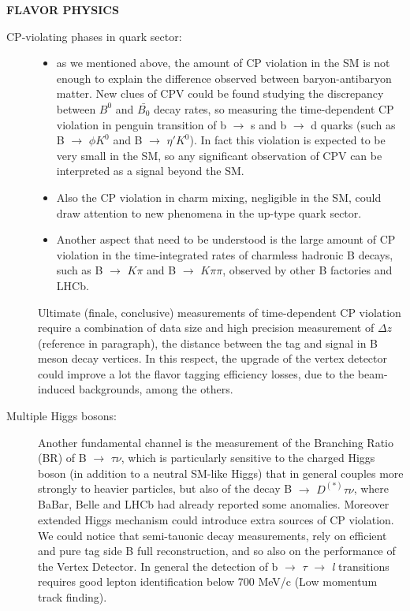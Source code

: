 \textbf{FLAVOR PHYSICS}
\begin{description}
\item [CP-violating phases in quark sector:]
	\begin{itemize}
	\item as we mentioned above, the amount of CP violation in the SM is not enough to explain the difference observed between baryon-antibaryon matter. New clues of CPV could be found studying the discrepancy between $B^{0}$ and $\bar{B_{0}}$ decay rates, so measuring the time-dependent CP violation in penguin transition of  b $\rightarrow$ s and  b $\rightarrow$ d quarks (such as B $\rightarrow$ $\phi K^{0}$ and B $\rightarrow$ $\eta' K^{0}$). In fact this violation is expected to be very small in the SM, so any significant observation of CPV can be interpreted as a signal beyond the SM.
	\item Also the CP violation in charm mixing, negligible in the SM, could draw attention to new phenomena in the up-type quark sector.
	\item Another aspect that need to be understood is the large amount of CP violation in the time-integrated rates of charmless hadronic B decays, such as B $\rightarrow$ $K\pi$ and B $\rightarrow$ $K\pi \pi$, observed by other B factories and LHCb. 
	\end{itemize}

Ultimate (finale, conclusive) measurements of time-dependent CP violation require a combination of data size and high precision measurement of $\Delta z$ (reference in paragraph), the distance between the tag and signal in B meson decay vertices. In this respect, the upgrade of the vertex detector could improve a lot the flavor tagging efficiency losses, due to the beam-induced backgrounds, among the others.

\item[Multiple Higgs bosons:] Another fundamental channel is the measurement of the Branching Ratio (BR) of B $\rightarrow$ $\tau\nu$, which is particularly sensitive to the charged Higgs boson (in addition to a neutral SM-like Higgs) that in general couples more strongly to heavier particles, but also of the decay B $\rightarrow$ $D^{(*)}$$\tau\nu$, where BaBar, Belle and LHCb had already reported some anomalies. Moreover extended Higgs mechanism could introduce extra sources of CP violation.
We could notice that semi-tauonic decay measurements, rely on efficient and pure tag side B full reconstruction, and so also on the performance of the Vertex Detector.
In general the detection of b $\rightarrow$ $\tau$ $\rightarrow$ \textit{l} transitions requires good lepton identification below 700 MeV/c (Low momentum track finding).


\end{description}
